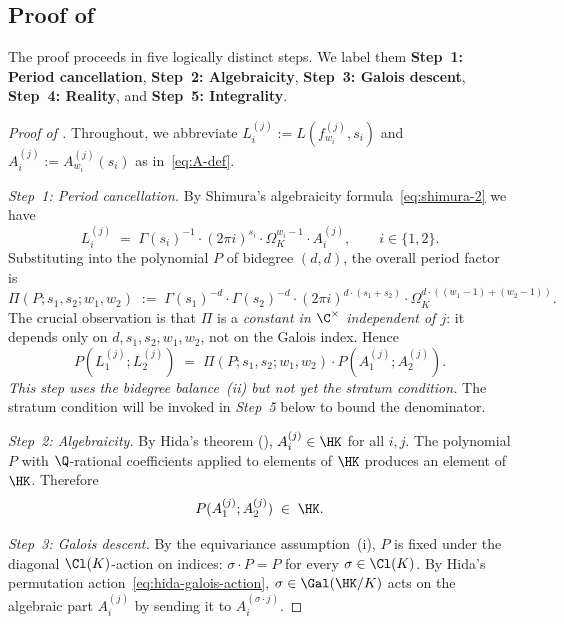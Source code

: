 \subsection{Proof of }\label{ss:proof-sketch}

The proof proceeds in five logically distinct steps. We label
them \textbf{Step~1: Period cancellation}, \textbf{Step~2:
Algebraicity}, \textbf{Step~3: Galois descent}, \textbf{Step~4:
Reality}, and \textbf{Step~5: Integrality}.

\begin{proof}[Proof of ]
Throughout, we abbreviate $L_i^{(j)} := L(f_{w_i}^{(j)}, s_i)$
and $A_i^{(j)} := A_{w_i}^{(j)}(s_i)$ as in~\eqref{eq:A-def}.

\medskip
\noindent\emph{Step~1: Period cancellation.}
By Shimura's algebraicity formula~\eqref{eq:shimura-2} we have
\begin{equation}\label{eq:L-as-period-times-alg}
L_i^{(j)} \;=\; \Gamma(s_i)^{-1} \cdot (2\pi i)^{s_i} \cdot
\Omega_K^{w_i - 1} \cdot A_i^{(j)}, \qquad i \in \{1, 2\}.
\end{equation}
Substituting into the polynomial $P$ of bidegree $(d, d)$, the
overall period factor is
\begin{equation}\label{eq:period-factor}
\Pi(P; s_1, s_2; w_1, w_2)
\;:=\; \Gamma(s_1)^{-d} \cdot \Gamma(s_2)^{-d} \cdot
(2\pi i)^{d \cdot (s_1 + s_2)} \cdot \Omega_K^{d \cdot ((w_1 - 1) + (w_2 - 1))}.
\end{equation}
The crucial observation is that $\Pi$ is a \emph{constant in
$\C^\times$ independent of $j$}: it depends only on
$d, s_1, s_2, w_1, w_2$, not on the Galois index. Hence
\[
P(L_1^{(j)}; L_2^{(j)})
\;=\; \Pi(P; s_1, s_2; w_1, w_2) \cdot P(A_1^{(j)}; A_2^{(j)}).
\]
\emph{This step uses the bidegree balance~(ii) but not yet the
stratum condition.} The stratum condition will be invoked in
\emph{Step~5} below to bound the denominator.

\medskip
\noindent\emph{Step~2: Algebraicity.}
By Hida's theorem (), $A_i^{(j)} \in \HK$ for
all $i, j$. The polynomial $P$ with $\Q$-rational coefficients
applied to elements of $\HK$ produces an element of $\HK$.
Therefore
\[
P(A_1^{(j)}; A_2^{(j)}) \;\in\; \HK.
\]

\medskip
\noindent\emph{Step~3: Galois descent.}
By the equivariance assumption~(i), $P$ is fixed under the
diagonal $\Cl(K)$-action on indices:
$\sigma \cdot P = P$ for every $\sigma \in \Cl(K)$. By Hida's
permutation action~\eqref{eq:hida-galois-action},
$\sigma \in \Gal(\HK/K)$ acts on the algebraic part
$A_i^{(j)}$ by sending it to $A_i^{(\sigma \cdot j)}$.


\end{proof}
